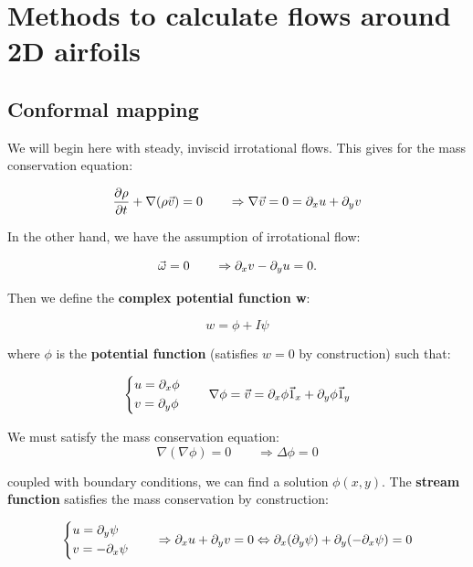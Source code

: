 \section{Methods to calculate flows around 2D airfoils}
	\subsection{Conformal mapping}
		We will begin here with steady, inviscid irrotational flows. This gives for the mass conservation equation:
		
		\begin{equation}
		\frac{\D \rho}{\D t} + \nabla (\rho \vec{v}) = 0 \qquad \Rightarrow \nabla \vec{v} = 0 = \D _x u + \D _y v
		\end{equation}
		
		In the other hand, we have the assumption of irrotational flow:
		
		\begin{equation}
		\vec{\omega} = 0 \qquad \Rightarrow \D _x v - \D _y u = 0.
		\end{equation}
		
		Then we define the \textbf{complex potential function w}:
		
		\begin{equation}
		w = \phi + I\psi
		\end{equation}		 
		
		where $\phi$ is the \textbf{potential function} (satisfies $w=0$ by construction) such that:
		
		\begin{equation}
		\left\{
		\begin{aligned}
		&u = \D _x \phi \\
		&v = \D _y \phi
		\end{aligned}
		\right.
		\qquad
		\nabla \phi = \vec{v} = \D _x\phi \vec{1} _x + \D _y \phi \vec{1}_y
		\end{equation}
		
		We must satisfy the mass conservation equation:
		\begin{equation}
		\nabla (\nabla \phi) = 0 \qquad \Rightarrow \Delta \phi = 0 
 		\end{equation}
 		
 		coupled with boundary conditions, we can find a solution $\phi (x,y)$. The \textbf{stream function} satisfies the mass conservation by construction:
 		
 		\begin{equation}
 		\left\{ 
 		\begin{aligned}
 		&u = \D _y \psi\\
 		&v = - \D _x \psi
 		\end{aligned}
 		\right.
 		\qquad \Rightarrow \D _x u + \D _y v = 0 \Leftrightarrow \D _x (\D _y \psi) + \D _y (- \D _x \psi) = 0
 		\end{equation}
 		
